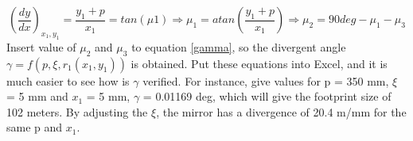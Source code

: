 \begin{equation}
\label{miu2}
(\frac{dy}{dx})_{x_{1},y_{1}} = \frac{y_{1}+p}{x_{1}} = tan(\mu{1})\Rightarrow \mu_{1} = atan(\frac{y_{1}+p}{x_{1}}) \Rightarrow \mu_{2} = 90deg - \mu_{1} - \mu_{3}
\end {equation}
Insert value of $\mu_{2}$ and $\mu_{3}$ to equation \ref{gamma}, so the divergent angle $\gamma = f(p, \xi, r_{1}(x_{1}, y_{1}))$ is obtained. Put these equations into Excel, and it is much easier to see how is $\gamma$ verified. For instance, give values for p = 350 mm, $\xi$ = 5 mm and $x_{1}$ = 5 mm, $\gamma$ = 0.01169 deg, which will give the footprint size of 102 meters. By adjusting the $\xi$, the mirror has a divergence of 20.4 m/mm for the same p and $x_{1}$.

